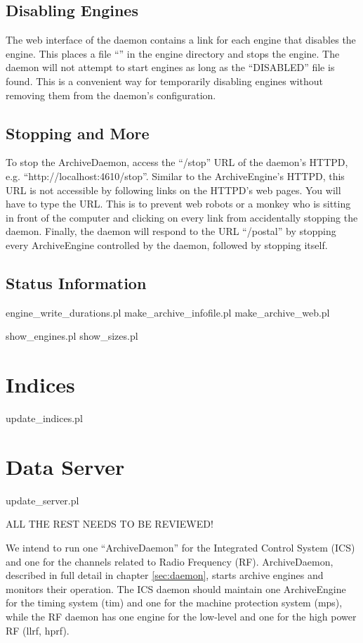\subsection{Disabling Engines}
The web interface of the daemon contains a link for each engine that
disables the engine. This places a file ``'' in
the engine directory and stops the engine.
The daemon will not attempt to start engines as long as the ``DISABLED''
file is found. This is a convenient way for temporarily disabling
engines without removing them from the daemon's configuration.

\subsection{Stopping and More}
To stop the ArchiveDaemon, access the ``/stop'' URL of the daemon's
HTTPD, e.g. ``http://localhost:4610/stop''.  Similar to the
ArchiveEngine's HTTPD, this URL is not accessible by following links
on the HTTPD's web pages. You will have to type the URL. This is to
prevent web robots or a monkey who is sitting in front of the computer
and clicking on every link from accidentally stopping the daemon.
Finally, the daemon will respond to the URL ``/postal'' by stopping every
ArchiveEngine controlled by the daemon, followed by stopping itself.



\subsection{Status Information}
engine\_write\_durations.pl
make\_archive\_infofile.pl
make\_archive\_web.pl

show\_engines.pl
show\_sizes.pl

\section{Indices}
update\_indices.pl

\section{Data Server}
update\_server.pl


ALL THE REST NEEDS TO BE REVIEWED!

We intend to run one ``ArchiveDaemon'' for the Integrated Control
System (ICS) and one for the channels related to Radio Frequency (RF).
ArchiveDaemon, described in full detail in chapter \ref{sec:daemon},
starts archive engines and monitors their operation. The ICS daemon
should maintain one ArchiveEngine for the timing system (tim) and one
for the machine protection system (mps), while the RF daemon has one
engine for the low-level and one for the high power RF (llrf, hprf).

